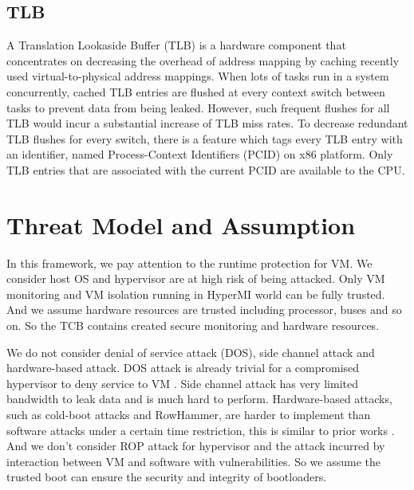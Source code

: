 \documentclass[conference]{IEEEtran}
\begin{document}
\subsection{TLB}
A Translation Lookaside Buffer (TLB) is a hardware component that concentrates on decreasing the overhead of address mapping by caching recently used virtual-to-physical address mappings. When lots of tasks run in a system concurrently, cached TLB entries are flushed at every context switch between tasks to prevent data from being leaked. However, such frequent flushes for all TLB would incur a substantial increase of TLB miss rates. To decrease redundant TLB flushes for every switch, there is a feature which tags every TLB entry with an identifier, named Process-Context Identifiers (PCID) on x86 platform. Only TLB entries that are associated with the current PCID are available to the CPU.

\section{Threat Model and Assumption}
In this framework, we pay attention to the runtime protection for VM. We consider host OS and hypervisor are at high risk of being attacked. Only VM monitoring and VM isolation running in HyperMI world can be fully trusted. And we assume hardware resources are trusted including processor, buses and so on. So the TCB contains created secure monitoring and hardware resources.


We do not consider denial of service attack (DOS), side channel attack and hardware-based attack. DOS attack is already trivial for a compromised hypervisor to deny service to VM \cite{Wang2015DDoS}. Side channel attack has very limited bandwidth to leak data and is much hard to perform. Hardware-based attacks, such as cold-boot attacks and RowHammer, are harder to implement than software attacks under a certain time restriction, this is similar to prior works \cite{Zhang2011CloudVisor}. And we don't consider ROP attack for hypervisor and the attack incurred by interaction between VM and software with vulnerabilities. So we assume the trusted boot can ensure the security and integrity of bootloaders.

\end{document}
